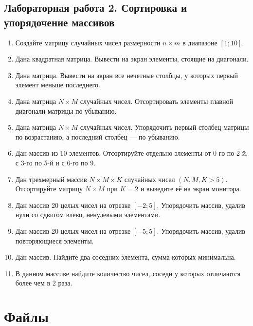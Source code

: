 \subsection{Лабораторная работа 2. Сортировка и упорядочение массивов}
\begin{enumerate}[leftmargin=*]
    \item Создайте матрицу случайных чисел размерности $n \times m$ в диапазоне $[1;10]$.
    \item Дана квадратная матрица. Вывести на экран элементы, стоящие на диагонали.
    \item Дана матрица. Вывести на экран все нечетные столбцы, у которых первый элемент меньше последнего.
    \item Дана матрица $N\times M$ случайных чисел. Отсортировать элементы главной диагонали матрицы по убыванию.
    \item Дана матрица $N\times M$ случайных чисел. Упорядочить первый столбец матрицы по возрастанию, а последний столбец --- по убыванию.
    \item Дан массив из 10 элементов. Отсортируйте отдельно элементы от 0-го по 2-й, с 3-го по 5-й и с 6-го по 9.
    \item Дан трехмерный массив $N\times M\times K$ случайных чисел $(N, M, K>5)$. Отсортируйте матрицу $N\times M$ при $K=2$ и выведите её на экран монитора.
    \item Дан массив 20 целых чисел на отрезке $[-2;5]$. Упорядочить массив, удалив нули со сдвигом влево, ненулевыми элементами.
    \item Дан массив 20 целых чисел на отрезке $[-5;5]$. Упорядочить массив, удалив повторяющиеся элементы.
    \item Дан массив. Найдите два соседних элемента, сумма которых минимальна.
    \item В данном массиве найдите количество чисел, соседи у которых отличаются более чем в 2 раза.
\end{enumerate}

\section{Файлы}
